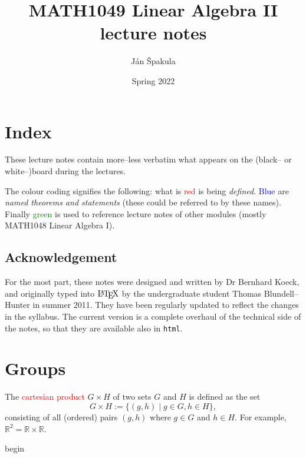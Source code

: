 \documentclass[
  12pt,
  a4paper,
  twoside]{article}
\title{MATH1049 Linear Algebra II lecture notes}
\author{Ján Špakula}
\date{Spring 2022}
\theoremstyle{plain}
\theoremstyle{definition}
\begin{document}
\maketitle

{
\setcounter{tocdepth}{2}
\tableofcontents
}
\hypertarget{index}{%
\section*{Index}\label{index}}

These lecture notes contain more--less verbatim what appears on the (black-- or white--)board during the lectures.

The
colour coding
signifies the following: what is
\textcolor{red}{red}
is being \emph{defined}.
\textcolor{blue}{Blue}
are \emph{named theorems and statements} (these could be referred to by these names). Finally
\textcolor{green}{green}
is used to reference lecture notes of other modules (mostly MATH1048 Linear Algebra I).

\hypertarget{acknowledgement}{%
\subsection*{Acknowledgement}\label{acknowledgement}}

For the most part, these notes were designed and written by Dr Bernhard Koeck, and originally typed into \(\text{\LaTeX}\) by the undergraduate student Thomas Blundell--Hunter in summer 2011. They have been regularly updated to reflect the changes in the syllabus. The current version is a complete overhaul of the technical side of the notes, so that they are available also in \texttt{html}.

\newpage

\hypertarget{groups}{%
\section{Groups}\label{groups}}

The \textcolor{red}{cartesian product} \(G\times H\) of two sets \(G\) and \(H\) is defined as the set
\[ G\times H := \{(g,h) \mid g\in G, h\in H\}, \]
consisting of all (ordered) pairs \((g,h)\) where \(g\in G\) and \(h\in H\). For example, \(\mathbb{R}^2 = \mathbb{R}\times \mathbb{R}\).

\csname begin\label{cnj:defn-group}
\end{document}
